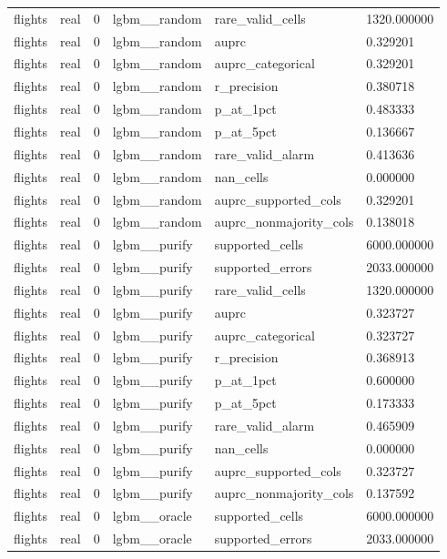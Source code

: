 \begin{tabular}{llllll}
flights & real & 0 & lgbm\_\_random & rare\_valid\_cells & 1320.000000 \\
flights & real & 0 & lgbm\_\_random & auprc & 0.329201 \\
flights & real & 0 & lgbm\_\_random & auprc\_categorical & 0.329201 \\
flights & real & 0 & lgbm\_\_random & r\_precision & 0.380718 \\
flights & real & 0 & lgbm\_\_random & p\_at\_1pct & 0.483333 \\
flights & real & 0 & lgbm\_\_random & p\_at\_5pct & 0.136667 \\
flights & real & 0 & lgbm\_\_random & rare\_valid\_alarm & 0.413636 \\
flights & real & 0 & lgbm\_\_random & nan\_cells & 0.000000 \\
flights & real & 0 & lgbm\_\_random & auprc\_supported\_cols & 0.329201 \\
flights & real & 0 & lgbm\_\_random & auprc\_nonmajority\_cols & 0.138018 \\
flights & real & 0 & lgbm\_\_purify & supported\_cells & 6000.000000 \\
flights & real & 0 & lgbm\_\_purify & supported\_errors & 2033.000000 \\
flights & real & 0 & lgbm\_\_purify & rare\_valid\_cells & 1320.000000 \\
flights & real & 0 & lgbm\_\_purify & auprc & 0.323727 \\
flights & real & 0 & lgbm\_\_purify & auprc\_categorical & 0.323727 \\
flights & real & 0 & lgbm\_\_purify & r\_precision & 0.368913 \\
flights & real & 0 & lgbm\_\_purify & p\_at\_1pct & 0.600000 \\
flights & real & 0 & lgbm\_\_purify & p\_at\_5pct & 0.173333 \\
flights & real & 0 & lgbm\_\_purify & rare\_valid\_alarm & 0.465909 \\
flights & real & 0 & lgbm\_\_purify & nan\_cells & 0.000000 \\
flights & real & 0 & lgbm\_\_purify & auprc\_supported\_cols & 0.323727 \\
flights & real & 0 & lgbm\_\_purify & auprc\_nonmajority\_cols & 0.137592 \\
flights & real & 0 & lgbm\_\_oracle & supported\_cells & 6000.000000 \\
flights & real & 0 & lgbm\_\_oracle & supported\_errors & 2033.000000 \\

\end{tabular}
